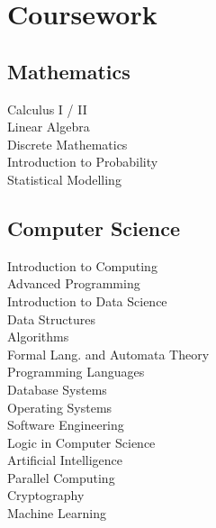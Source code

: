 \documentclass[letterpaper]{deedy-resume} %
\begin{document}
\begin{minipage}[t]{0.33\textwidth} %


\section{Coursework}

\subsection{Mathematics}

Calculus I / II \\
Linear Algebra \\
Discrete Mathematics \\
Introduction to Probability \\
Statistical Modelling

\sectionspace %


\subsection{Computer Science}

Introduction to Computing \\
Advanced Programming \\
Introduction to Data Science \\
Data Structures \\
Algorithms \\
Formal Lang. and Automata Theory \\
Programming Languages \\
Database Systems \\
Operating Systems \\
Software Engineering \\
Logic in Computer Science \\
Artificial Intelligence \\
Parallel Computing \\
Cryptography \\
Machine Learning

\sectionspace %



\end{minipage}
\end{document}
